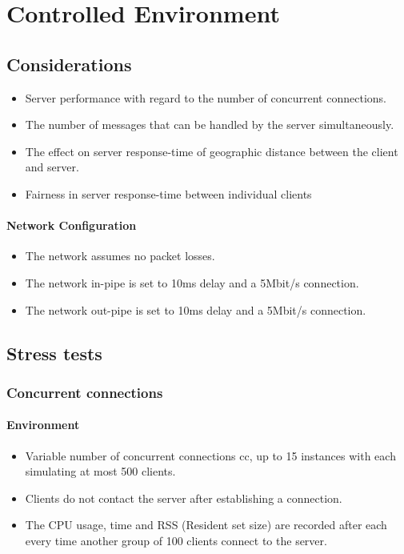 \documentclass[12pt]{article}
\begin{document}
\section{Controlled Environment}
\subsection{Considerations}
\begin{itemize}
\item Server performance with regard to the number of concurrent connections.
\item The number of messages that can be handled by the server simultaneously.
\item The effect on server response-time of geographic distance between the client and server.
\item Fairness in server response-time between individual clients
\end{itemize}

\paragraph{Network Configuration}
\begin{itemize}
\item The network assumes no packet losses.
\item The network in-pipe is set to 10ms delay and a 5Mbit/s connection.
\item The network out-pipe is set to 10ms delay and a 5Mbit/s connection.
\end{itemize}



\subsection{Stress tests}

\subsubsection{Concurrent connections}
\paragraph{Environment}
\begin{itemize}
\item Variable number of concurrent connections cc, up to 15 instances with each simulating at most 500 clients.
\item Clients do not contact the server after establishing a connection.
\item The CPU usage, time and RSS (Resident set size) are recorded after each every time another group of 100 clients connect to the server.
\end{itemize}
\end{document}
